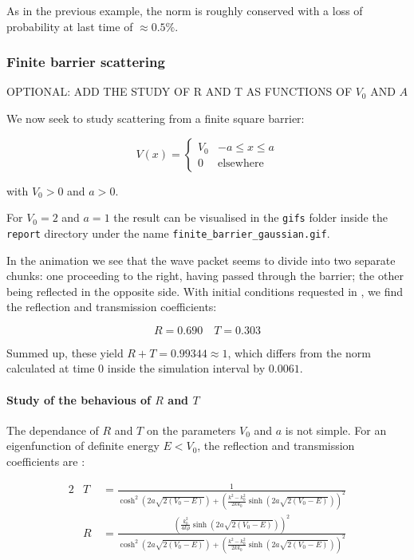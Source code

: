 \documentclass[a4paper,11]{article}
\newcommand{\mdcode}[1]{\lstinline[backgroundcolor=\color{gray!10}, frame=single, frameround=tttt]|#1|}
\begin{document}
As in the previous example, the norm is roughly conserved with a loss 
of probability at last time of $\approx 0.5\%$.

\subsubsection{Finite barrier scattering}

OPTIONAL: ADD THE STUDY OF R AND T AS FUNCTIONS OF $V_{0}$ AND $A$

We now seek to study scattering from a finite square barrier:

\[
	V(x) = \begin{cases}
		V_{0} & -a \leq x \leq a \\
		0     & \text{elsewhere}
	\end{cases}
\]

with $V_{0} > 0$ and $a > 0$.

For $V_{0}=2$ and $a=1$ the result can be visualised in the 
\mdcode{gifs} folder inside the \mdcode{report} directory under the name
\mdcode{finite_barrier_gaussian.gif}.

In the animation we see that the wave packet seems to divide into two separate
chunks: one proceeding to the right, having passed through the barrier;
the other being reflected in the opposite side. With initial conditions 
requested in \cite{brida}, we find the reflection and transmission coefficients:

\[
	R = 0.690 \quad T = 0.303
\]

Summed up, these yield $R + T = 0.99344 \approx 1$, which differs from 
the norm calculated at time 0 inside the simulation interval by $0.0061$.

\paragraph{Study of the behavious of $R$ and $T$}

The dependance of $R$ and $T$ on the parameters $V_{0}$ and
$a$ is not simple. For an eigenfunction of definite energy $E<V_{0}$,
the reflection and transmission coefficients are 
\parencite[Complement~N\textsubscript{III}]{cohen}:

\begin{alignat*}{2}
	&T \,& = \frac{1}{\cosh^{2}(2a\sqrt{2(V_{0}-E)}) + \left( \frac{k^{2}-k_{0}^{2}}
		{2kk_{0}}\sinh(2a\sqrt{2(V_{0}-E)}) \right)^{2}} \\
	&R \,& = \frac{\left( \frac{k_{0}^{2}}{4k\rho}\sinh(2a\sqrt{2(V_{0}-E)})\right)^{2}}
		{\cosh^{2}(2a\sqrt{2(V_{0}-E)}) + \left( \frac{k^{2}-k_{0}^{2}}
		{2kk_{0}}\sinh(2a\sqrt{2(V_{0}-E)}) \right)^{2}}
\end{alignat*}
\end{document}
